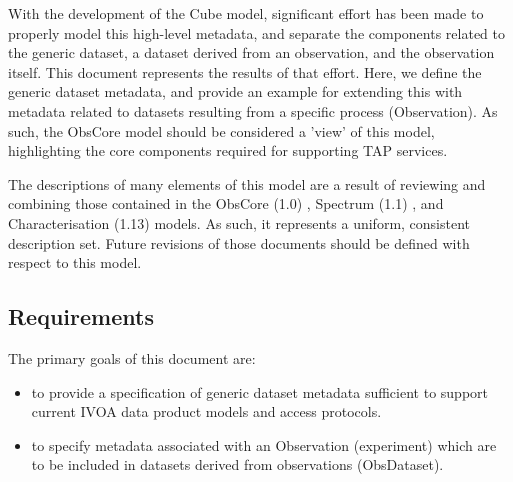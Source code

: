 \documentclass[11pt,a4paper]{ivoa}
\begin{document}
With the development of the Cube model, significant effort has been made to
properly model this high-level metadata, and separate the components related
to the generic dataset, a dataset derived from an observation, and the
observation itself. This document represents the results of that effort. Here,
we define the generic dataset metadata, and provide an example for extending
this with metadata related to datasets resulting from a specific process
(Observation). As such, the ObsCore model should be considered a 'view' of this
model, highlighting the core components required for supporting TAP services.

The descriptions of many elements of this model are a result of reviewing and
combining those contained in the ObsCore (1.0) \citep{2011ivoa.spec.1028T}, Spectrum (1.1) \citep{2011ivoa.spec.1120M}, and
Characterisation (1.13) \citep{2008ivoa.spec.0325L} models.
As such, it represents a uniform, consistent
description set. Future revisions of those documents should be defined with
respect to this model.

%
%
%
\subsection{Requirements}
\label{sect:reqs}

The primary goals of this document are:
\begin{itemize}
  \item to provide a specification of generic dataset metadata sufficient to
    support current IVOA data product models and access protocols.
  \item to specify metadata associated with an Observation (experiment) which are
    to be included in datasets derived from observations (ObsDataset).
\end{itemize}    

%
%
\end{document}
